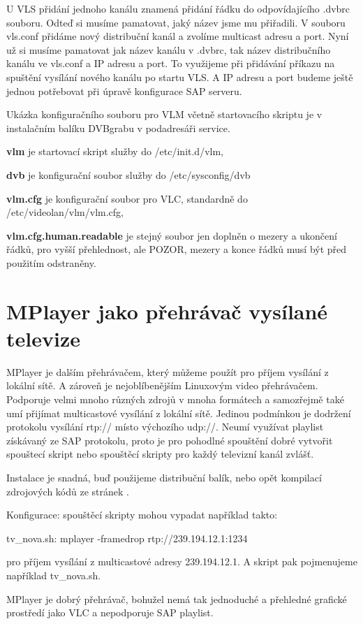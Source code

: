 \vspace{10pt}

U VLS přidání jednoho kanálu znamená přidání řádku do odpovídajícího .dvbrc souboru. Odteď si musíme pamatovat, jaký název jsme mu přiřadili. V souboru vls.conf přidáme nový distribuční kanál a zvolíme multicast adresu a port. Nyní už si musíme pamatovat jak název kanálu v .dvbrc, tak název distribučního kanálu ve vls.conf a IP adresu a port. To využijeme při přidávání příkazu na spuštění vysílání nového kanálu po startu VLS. A IP adresu a port budeme ještě jednou potřebovat při úpravě konfigurace SAP serveru.

\vspace{10pt}

Ukázka konfiguračního souboru pro VLM včetně startovacího skriptu je v instalačním balíku DVBgrabu v podadresáři service.

\textbf{vlm} je startovací skript služby do /etc/init.d/vlm, 

\textbf{dvb} je konfigurační soubor služby do /etc/sysconfig/dvb

\textbf{vlm.cfg} je konfigurační soubor pro VLC, standardně do /etc/videolan/vlm/vlm.cfg,

\textbf{vlm.cfg.human.readable} je stejný soubor jen doplněn o mezery a ukončení řádků, pro vyšší přehlednost, ale POZOR, mezery a konce řádků musí být před použitím odstraněny.

\vspace{10pt}

\section {MPlayer jako přehrávač vysílané televize}

MPlayer je dalším přehrávačem, který můžeme použít pro příjem vysílání z lokální sítě. A zároveň je nejoblíbenějším Linuxovým video přehrávačem. Podporuje velmi mnoho různých zdrojů v mnoha formátech a samozřejmě také umí přijímat multicastové vysílání z lokální sítě. Jedinou podmínkou je dodržení protokolu vysílání rtp:// místo výchozího udp://. Neumí využívat playlist získávaný ze SAP protokolu, proto je pro pohodlné spouštění dobré vytvořit spouštecí skript nebo spouštěcí skripty pro každý televizní kanál zvlášť.
\vspace{10pt}


\vspace{10pt}

Instalace je snadná, buď použijeme distribuční balík, nebo opět kompilací zdrojových kódů ze stránek \cite{mplayerURL}. 

\vspace{10pt}

Konfigurace: spouštěcí skripty mohou vypadat například takto:

tv\_nova.sh: mplayer -framedrop rtp://239.194.12.1:1234

pro příjem vysílání z multicastové adresy 239.194.12.1. A skript pak pojmenujeme například tv\_nova.sh.

\vspace{10pt}

MPlayer je dobrý přehrávač, bohužel nemá tak jednoduché a přehledné grafické prostředí jako VLC a nepodporuje SAP playlist.
